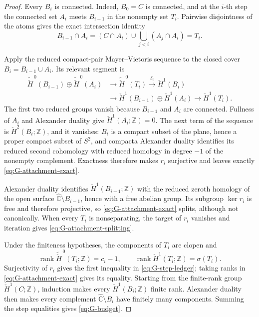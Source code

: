 \documentclass[11pt,reqno]{amsart}
\theoremstyle{definition}
\theoremstyle{remark}
\newcommand{\Z}{\mathbb Z}
\newcommand{\Chat}{\widehat{\mathbb C}}
\begin{document}
\begin{proof}
Every $B_i$ is connected.  Indeed, $B_0=C$ is connected, and at the
$i$-th step the connected set $A_i$ meets $B_{i-1}$ in the nonempty set
$T_i$.  Pairwise disjointness of the atoms gives the exact intersection
identity
\[
 B_{i-1}\cap A_i
 =
 (C\cap A_i)\cup\bigcup_{j<i}(A_j\cap A_i)
 =T_i .
\]

Apply the reduced compact-pair Mayer--Vietoris sequence to the closed cover
$B_i=B_{i-1}\cup A_i$.  Its relevant segment is
\[
\begin{split}
 \widetilde{\check H}^{\,0}(B_{i-1})
 \oplus\widetilde{\check H}^{\,0}(A_i)
 &\longrightarrow
 \widetilde{\check H}^{\,0}(T_i)
 \xrightarrow{\delta_i}
 \check H^1(B_i)\\
 &\longrightarrow
 \check H^1(B_{i-1})\oplus\check H^1(A_i)
 \longrightarrow
 \check H^1(T_i).
\end{split}
\]
The first two reduced groups vanish because $B_{i-1}$ and $A_i$ are
connected.  Fullness of $A_i$ and Alexander duality give
$\check H^1(A_i;\Z)=0$.  The next term of the sequence is
$\check H^2(B_i;\Z)$, and it vanishes: $B_i$ is a compact subset of the
plane, hence a proper compact subset of $S^2$, and compacta Alexander
duality identifies its reduced second cohomology with reduced homology in
degree $-1$ of the nonempty complement.  Exactness therefore makes $r_i$
surjective and leaves exactly \eqref{eq:G-attachment-exact}.

Alexander duality identifies $\check H^1(B_{i-1};\Z)$ with the reduced
zeroth homology of the open surface $\Chat\setminus B_{i-1}$, hence with a
free abelian group.  Its subgroup $\ker r_i$ is free and therefore
projective, so \eqref{eq:G-attachment-exact} splits, although not
canonically.  When every $T_i$ is nonseparating, the target of $r_i$
vanishes and iteration gives \eqref{eq:G-attachment-splitting}.

Under the finiteness hypotheses, the components of $T_i$ are clopen and
\[
 \operatorname{rank}\widetilde{\check H}^{\,0}(T_i;\Z)=c_i-1,
 \qquad
 \operatorname{rank}\check H^1(T_i;\Z)=\sigma(T_i).
\]
Surjectivity of $r_i$ gives the first inequality in
\eqref{eq:G-step-ledger}; taking ranks in
\eqref{eq:G-attachment-exact} gives its equality.  Starting from the
finite-rank group $\check H^1(C;\Z)$, induction makes every
$\check H^1(B_i;\Z)$ finite rank.  Alexander duality then makes every
complement $\Chat\setminus B_i$ have finitely many components.  Summing
the step equalities gives \eqref{eq:G-budget}.
\end{proof}
\end{document}

